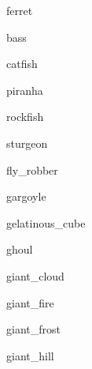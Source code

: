 \documentclass[letterpaper,serif]{module}
\begin{document}
\begin{newmonster}{ferret}\end{newmonster}

\begin{newmonster}{bass}\end{newmonster}

\begin{newmonster}{catfish}\end{newmonster}

\begin{newmonster}{piranha}\end{newmonster}

\begin{newmonster}{rockfish}\end{newmonster}

\begin{newmonster}{sturgeon}\end{newmonster}

\begin{newmonster}{fly_robber}\end{newmonster}

\begin{newmonster}{gargoyle}\end{newmonster}

\begin{newmonster}{gelatinous_cube}\end{newmonster}

\begin{newmonster}{ghoul}\end{newmonster}

\begin{newmonster}{giant_cloud}\end{newmonster}

\begin{newmonster}{giant_fire}\end{newmonster}

\begin{newmonster}{giant_frost}\end{newmonster}

\begin{newmonster}{giant_hill}\end{newmonster}
\end{document}
